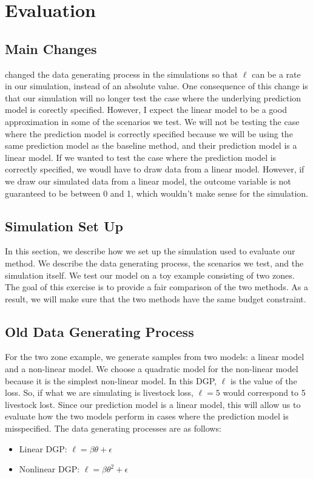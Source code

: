 \documentclass[11pt]{article}
\begin{document}
\section{Evaluation}
  \subsection{Main Changes}
   changed the data generating process in the simulations so that $\ell$ can be a rate in our simulation, instead of an absolute value. One consequence of this change is that our simulation will no longer test the case where the underlying prediction model is corectly specified. However, I expect the linear model to be a good approximation in some of the scenarios we test. We will not be testing the case where the prediction model is correctly specified because we will be using the same prediction model as the baseline method, and their prediction model is a linear model. If we wanted to test the case where the prediction model is correctly specified, we woudl have to draw data from a linear model. However, if we draw our simulated data from a linear model, the outcome variable is not guaranteed to be between 0 and 1, which wouldn't make sense for the simulation. 
  \subsection{Simulation Set Up}
  In this section, we describe how we set up the simulation used to evaluate our method. We describe the data generating process, the scenarios we test, and the simulation itself. We test our model on a toy example consisting of two zones. The goal of this exercise is to provide a fair comparison of the two methods. As a result, we will make sure that the two methods have the same budget constraint.

\subsection{Old Data Generating Process}
For the two zone example, we generate samples from two models: a linear model and a non-linear model. We choose a quadratic model for the non-linear model because it is the simplest non-linear model. In this DGP, $\ell$ is the value of the loss. So, if what we are simulating is livestock loss, $\ell=5$ would correspond to 5 livestock lost. Since our prediction model is a linear model, this will allow us to evaluate how the two models perform in cases where the prediction model is misspecified. The data generating processes are as follows: 
      \begin{itemize}
        \item Linear DGP: $\ell = \beta \theta + \epsilon$
        \item Nonlinear DGP: $\ell = \beta \theta^2 + \epsilon$
      \end{itemize}
\end{document}
